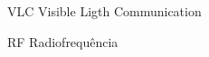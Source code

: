 \begin{siglas}
  \item[VLC]  Visible Ligth Communication
  \item[RF]   Radiofrequência
\end{siglas}

